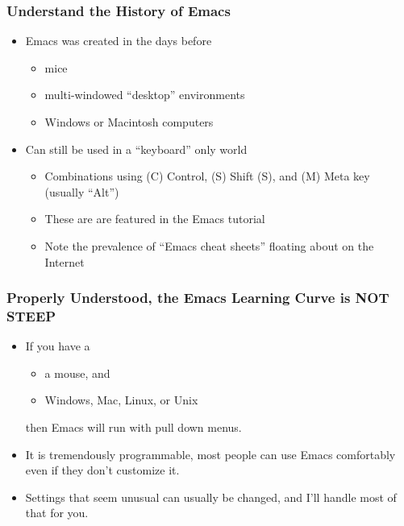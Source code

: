 \documentclass[11pt,english]{beamer}
\begin{document}
\begin{frame}[containsverbatim]
  \frametitle{Understand the History of Emacs}
  \begin{itemize}
  \item Emacs was created in the days before

    \begin{itemize}
    \item mice
    \item multi-windowed ``desktop'' environments
    \item Windows or Macintosh computers
    \end{itemize}
  \item Can still be used in a ``keyboard'' only world

    \begin{itemize}
    \item Combinations using (C) Control, (S) Shift
      (S), and (M) Meta key (usually ``Alt'')
    \item These are are featured in the Emacs tutorial
    \item Note the prevalence of ``Emacs cheat sheets'' floating about on
      the Internet
    \end{itemize}
  \end{itemize}
\end{frame}

\begin{frame}[containsverbatim]
  \frametitle{Properly Understood, the Emacs Learning Curve is NOT STEEP}
  \begin{itemize}
  \item If you have a 
    \begin{itemize}
      \item a mouse, and 
      \item Windows, Mac, Linux, or Unix
    \end{itemize}
   then Emacs will run with pull down menus.
  \item It is tremendously programmable, most people can use Emacs
    comfortably even if they don't customize it.
  \item Settings that seem unusual can usually be changed, and I'll
    handle most of that for you.
  \end{itemize}
\end{frame}
\end{document}

